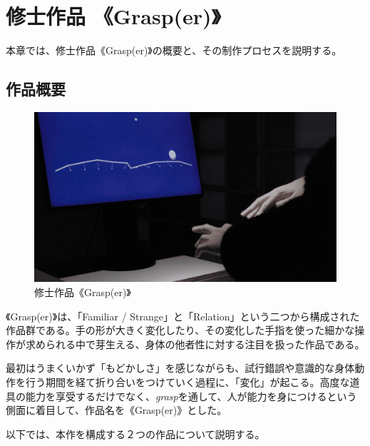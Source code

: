 \chapter{修士作品 《Grasp(er)》}
\label{about_grasper}
本章では、修士作品《Grasp(er)》の概要と、その制作プロセスを説明する。

\section{作品概要}
\begin{figure}[H]
  \centering
  \includegraphics[width=15cm]{img/thumbnail.png}
  \caption{修士作品《Grasp(er)》}
  \label{grasper}
\end{figure}

《Grasp(er)》は、「Familiar / Strange」と「Relation」という二つから構成された作品群である。手の形が大きく変化したり、その変化した手指を使った細かな操作が求められる中で芽生える、身体の他者性に対する注目を扱った作品である。

最初はうまくいかず「もどかしさ」を感じながらも、試行錯誤や意識的な身体動作を行う期間を経て折り合いをつけていく過程に、「変化」が起こる。高度な道具の能力を享受するだけでなく、\textit{grasp}を通して、人が能力を身につけるという側面に着目して、作品名を《Grasp(er)》とした。

以下では、本作を構成する２つの作品について説明する。



